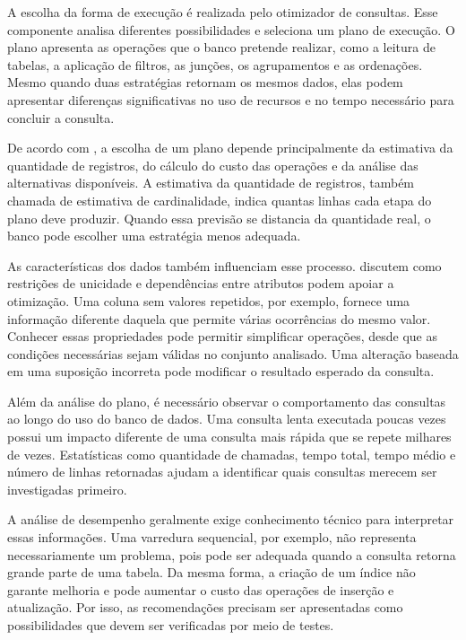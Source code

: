 \documentclass{UNESC}
\begin{document}
A escolha da forma de execução é realizada pelo otimizador de consultas. Esse componente analisa diferentes possibilidades e seleciona um plano de execução. O plano apresenta as operações que o banco pretende realizar, como a leitura de tabelas, a aplicação de filtros, as junções, os agrupamentos e as ordenações. Mesmo quando duas estratégias retornam os mesmos dados, elas podem apresentar diferenças significativas no uso de recursos e no tempo necessário para concluir a consulta.

De acordo com , a escolha de um plano depende principalmente da estimativa da quantidade de registros, do cálculo do custo das operações e da análise das alternativas disponíveis. A estimativa da quantidade de registros, também chamada de estimativa de cardinalidade, indica quantas linhas cada etapa do plano deve produzir. Quando essa previsão se distancia da quantidade real, o banco pode escolher uma estratégia menos adequada.

As características dos dados também influenciam esse processo.  discutem como restrições de unicidade e dependências entre atributos podem apoiar a otimização. Uma coluna sem valores repetidos, por exemplo, fornece uma informação diferente daquela que permite várias ocorrências do mesmo valor. Conhecer essas propriedades pode permitir simplificar operações, desde que as condições necessárias sejam válidas no conjunto analisado. Uma alteração baseada em uma suposição incorreta pode modificar o resultado esperado da consulta.

Além da análise do plano, é necessário observar o comportamento das consultas ao longo do uso do banco de dados. Uma consulta lenta executada poucas vezes possui um impacto diferente de uma consulta mais rápida que se repete milhares de vezes. Estatísticas como quantidade de chamadas, tempo total, tempo médio e número de linhas retornadas ajudam a identificar quais consultas merecem ser investigadas primeiro.

A análise de desempenho geralmente exige conhecimento técnico para interpretar essas informações. Uma varredura sequencial, por exemplo, não representa necessariamente um problema, pois pode ser adequada quando a consulta retorna grande parte de uma tabela. Da mesma forma, a criação de um índice não garante melhoria e pode aumentar o custo das operações de inserção e atualização. Por isso, as recomendações precisam ser apresentadas como possibilidades que devem ser verificadas por meio de testes.
\end{document}
